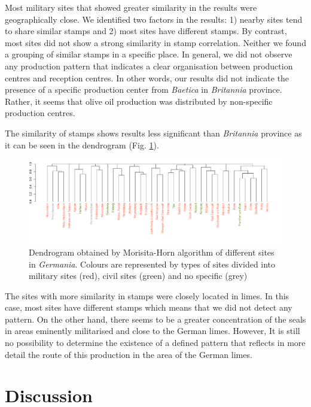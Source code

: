\documentclass[review]{elsarticle}
\begin{document}
Most military sites that showed greater similarity in the results were geographically close. We identified two factors in the results: 1) nearby sites tend to share similar stamps and 2) most sites have different stamps. 
By contrast, most sites did not show a strong similarity in stamp correlation. Neither we found a grouping of similar stamps in a specific place. In general, we did not observe any production pattern that indicates a clear organisation between production centres and reception centres. In other words, our results did not indicate the presence of a specific production center from \textit{Baetica} in \textit{Britannia} province. Rather, it seems that olive oil production was distributed by non-specific production centres. 


The similarity of stamps shows results less significant than \textit{Britannia} province as it can be seen in the dendrogram (Fig. \ref{germap}). 

\begin{figure}
	\centering
\includegraphics[width=\linewidth]{figs/dendroger5.pdf}
\caption{Dendrogram obtained by Morisita-Horn algorithm of different sites in \textit{Germania}. Colours are represented by types of sites divided into military sites (red), civil sites (green) and no specific (grey)}
\label{germap}
\end{figure}


The sites with more similarity in stamps were closely located in limes. In this case, most sites have different stamps which means that we did not detect any pattern. On the other hand, there seems to be a greater concentration of the seals in areas eminently militarised and close to the German limes. However, It is still no possibility to determine the existence of a defined pattern that reflects in more detail the route of this production in the area of the German limes.


\section{Discussion}
\end{document}
